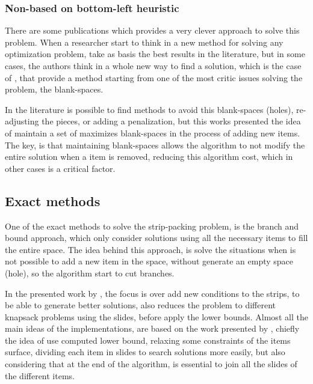 \subsubsection{Non-based on bottom-left heuristic}

There are some publications which provides a very clever
approach to solve this problem.
When a researcher start to think in a new method for
solving any optimization problem, take as basis
the best results in the literature,
but in some cases, the authors think in a whole new way
to find a solution, which is the case of \cite{neveu},
that provide a method starting from one of the most critic
issues solving the problem, the blank-spaces.

In the literature is possible to find methods to avoid
this blank-spaces (holes), re-adjusting the pieces,
or adding a penalization, but this works presented the
idea of maintain a set of maximizes blank-spaces in the
process of adding new items.
The key, is that maintaining blank-spaces allows the
algorithm to not modify the entire solution when a item
is removed, reducing this algorithm cost,
which in other cases is a critical factor.



\subsection{Exact methods}

One of the exact methods to solve the strip-packing problem,
is the branch and bound approach,
which only consider solutions using all the necessary items
to fill the entire space.
The idea behind this approach, is solve the situations when
is not possible to add a new item in the space,
without generate an empty space (hole),
so the algorithm start to cut branches.

In the presented work by \cite{alvarez},
the focus is over add new conditions to the strips,
to be able to generate better solutions,
also reduces the problem to different knapsack problems using the slides,
before apply the lower bounds.
Almost all the main ideas of the implementations,
are based on the work presented by \cite{martello},
chiefly the idea of use computed lower bound,
relaxing some constraints of the items surface,
dividing each item in slides to search solutions
more easily, but also considering that at the end of the algorithm,
is essential to join all the slides of the different items.


% 

